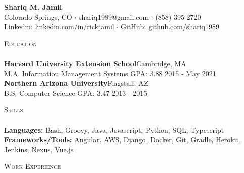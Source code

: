 \documentclass[a4paper]{article}
\newcommand{\lineunder} {
    \vspace*{-8pt} \\
    \hspace*{-18pt} \hrulefill \\
}
\newcommand{\header} [1] {
    {\hspace*{-18pt}\vspace*{6pt} \textsc{#1}}
    \vspace*{-6pt} \lineunder
}
\begin{document}
\vspace*{-40pt}

    

\vspace*{-10pt}
\begin{center}
	{\Huge \bfseries {Shariq M. Jamil}}\\
	Colorado Springs, CO $\cdot$ shariq1989@gmail.com $\cdot$ (858) 395-2720\\
	Linkedin: linkedin.com/in/rickjamil $\cdot$ GitHub: github.com/shariq1989
\end{center}

\header{Education}
\textbf{Harvard University Extension School}\hfill Cambridge, MA\\
M.A. Information Management Systems \textrm{GPA: 3.88} \hfill 2015 - May 2021\\
\vspace{2mm}
\textbf{Northern Arizona University}\hfill Flagstaff, AZ\\
B.S. Computer Science \textrm{GPA: 3.47} \hfill 2013 - 2015\\
\vspace{2mm}

\header{Skills}
\textbf{Languages:} Bash, Groovy, Java, Javascript, Python, SQL, Typescript\\  
\vspace{2mm}
\textbf{Frameworks/Tools:} Angular, AWS, Django, Docker, Git, Gradle, Heroku, Jenkins, Nexus, Vue.js\\
\vspace{2mm}

\header{Work Experience}
\vspace{1mm}
\end{document}
